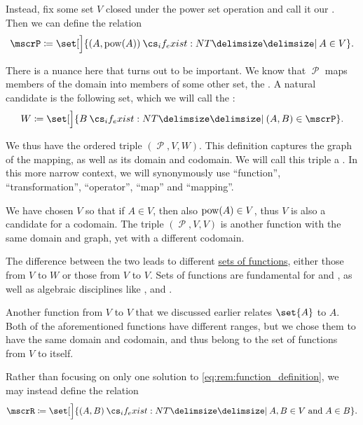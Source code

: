 \begin{remark}
  Instead, fix some set \( V \) closed under the power set operation and call it our . Then we can define the relation
  \begin{equation*}
    \mscrP \coloneqq \set[\Big]{ (A, \pow(A)) \given* A \in V }.
  \end{equation*}

  There is a nuance here that turns out to be important. We know that \( \mscrP \) maps members of the domain into members of some other set, the . A natural candidate is the following set, which we will call the :
  \begin{equation*}
    W \coloneqq \set[\Big]{ B \given* (A, B) \in \mscrP }.
  \end{equation*}

  We thus have the ordered triple \( (\mscrP, V, W) \). This definition captures the graph of the mapping, as well as its domain and codomain. We will call this triple a . In this more narrow context, we will synonymously use \enquote{function}, \enquote{transformation}, \enquote{operator}, \enquote{map} and \enquote{mapping}.

  We have chosen \( V \) so that if \( A \in V \), then also \( \operatorname{pow}(A) \in V \), thus \( V \) is also a candidate for a codomain. The triple \( (\mscrP, V, V) \) is another function with the same domain and graph, yet with a different codomain.

  The difference between the two leads to different \hyperref[def:function/set_of_functions]{sets of functions}, either those from \( V \) to \( W \) or those from \( V \) to \( V \). Sets of functions are fundamental for  and , as well as algebraic disciplines like ,  and .

  Another function from \( V \) to \( V \) that we discussed earlier relates \( \set{ A } \) to \( A \). Both of the aforementioned functions have different ranges, but we chose them to have the same domain and codomain, and thus belong to the set of functions from \( V \) to itself.

  Rather than focusing on only one solution to \eqref{eq:rem:function_definition}, we may instead define the relation
  \begin{equation*}
    \mscrR \coloneqq \set[\Big]{ (A, B) \given* A, B \in V \T{and} A \in B }.
  \end{equation*}


\end{remark}
